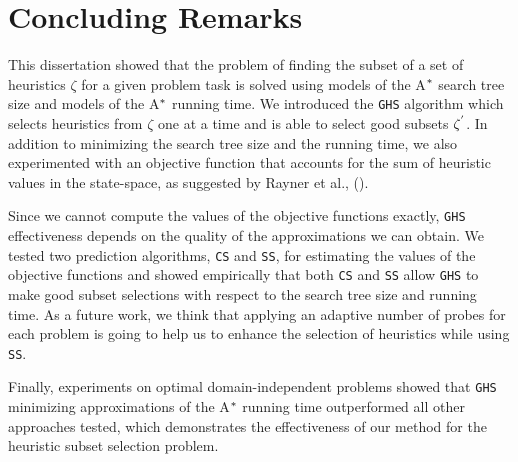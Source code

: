 
 
\chapter{Concluding Remarks}\label{ch:conclusions}

\noindent
This dissertation showed that the problem of finding the subset of a set of heuristics $\zeta$ for a given problem task is solved using models of the A$\sp{*}$ search tree size and models of the A$\sp{*}$ running time. We introduced the \texttt{GHS} algorithm which selects heuristics from $\zeta$ one at a time and is able to select good subsets $\zeta\sp{'}$. In addition to minimizing the search tree size and the running time, we also experimented with an objective function that accounts for the sum of heuristic values in the state-space, as suggested by Rayner et al., (\citeyear{raynersss13}).

Since we cannot compute the values of the objective functions exactly, \texttt{GHS} effectiveness depends on the quality of the approximations we can obtain. We tested two prediction algorithms, \texttt{CS} and \texttt{SS}, for estimating the values of the objective functions and showed empirically that both \texttt{CS} and \texttt{SS} allow \texttt{GHS} to make good subset selections with respect to the search tree size and running time. As a future work, we think that applying an adaptive number of probes for each problem is going to help us to enhance the selection of heuristics while using \texttt{SS}.

Finally, experiments on optimal domain-independent problems showed that \texttt{GHS} minimizing approximations of the A$\sp{*}$ running time outperformed all other approaches tested, which demonstrates the effectiveness of our method for the heuristic subset selection problem.
